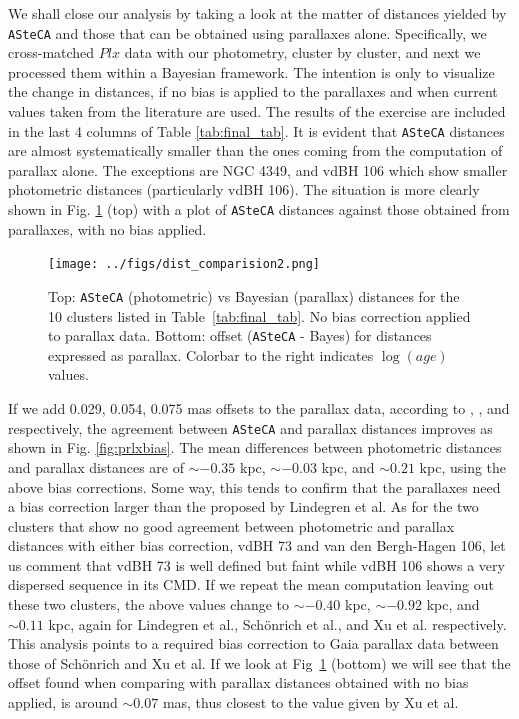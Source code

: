 \documentclass[draft]{aa}
\begin{document}
We shall close our analysis by taking a look at the matter of distances yielded
by \texttt{ASteCA} and those that can be obtained using parallaxes alone.
Specifically, we cross-matched $Plx$ data with our photometry, cluster by
cluster, and next we processed them within a Bayesian framework. The intention
is only to visualize the change in distances, if no bias is applied to the
parallaxes and when current values taken from the literature are used. The
results of the exercise are included in the last 4 columns of Table 
\ref{tab:final_tab}. It is evident that \texttt{ASteCA} distances are almost
systematically smaller than the ones coming from the computation of parallax
alone. The exceptions are NGC 4349, and vdBH 106 which show smaller photometric
distances (particularly vdBH 106). The situation is more clearly shown in Fig. 
\ref{fig:prlxnobias}  (top) with a plot of \texttt{ASteCA} distances against
those obtained from parallaxes, with no bias applied.

\begin{figure}[ht]
    \centering
    \texttt{[image: ../figs/dist\_comparision2.png]}
    \caption{Top: \texttt{ASteCA} (photometric) vs Bayesian (parallax)
    distances for the 10 clusters listed in Table~\ref{tab:final_tab}. No bias
    correction applied to parallax data.
    Bottom: offset (\texttt{ASteCA} - Bayes) for distances expressed
    as parallax. Colorbar to the right indicates $\log(age)$ values.}
    \label{fig:prlxnobias}
\end{figure}

If we add 0.029, 0.054, 0.075 mas offsets to the parallax data, according to
\cite{Lindegren_2018}, \cite{Schonrich2019}, and
\cite{Xu_2019} respectively, the agreement between \texttt{ASteCA} and
parallax distances improves as shown in Fig. \ref{fig:prlxbias}.
%
The mean differences between photometric distances 
and parallax distances are of $\sim-0.35$ kpc,
$\sim-0.03$ kpc, and $\sim0.21$ kpc, using the above bias corrections. Some
way, this tends to confirm that the parallaxes need a bias correction larger
than the proposed by Lindegren et al.
%
As for the two clusters that show no good agreement between photometric and
parallax distances with either bias correction, vdBH 73 and van den Bergh-Hagen
106, let us comment that vdBH 73 is well defined but faint while vdBH 106 shows
a very dispersed sequence in its CMD.
%
If we repeat the mean computation leaving out these two clusters, the above
values change to $\sim-0.40$ kpc, $\sim-0.92$ kpc, and $\sim0.11$ kpc, again
for Lindegren et al., Sch\"onrich et al., and Xu et al. respectively. This
analysis points to a required bias correction to Gaia parallax data between
those of Sch\"onrich and Xu et al. If we look at Fig~\ref{fig:prlxnobias} 
(bottom) we will see that the offset found when comparing with parallax
distances obtained with no bias applied, is around $\sim0.07$ mas, thus closest
to the value given by Xu et al.
\end{document}
